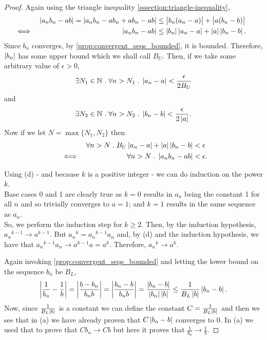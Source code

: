 \documentclass[../MathsNotesBase.tex]{subfiles}
\begin{document}
{\begin{proof}
			Again using the triangle inequality \ref{sssection:triangle-inequality},
			\begin{align*}
				&& \left\lvert a_nb_n - ab\right\rvert = \left\lvert a_nb_n - ab_n + ab_n - ab\right\rvert &\leq \left\lvert b_n(a_n - a)\right\rvert + \left\lvert a(b_n - b)\right\rvert  &\text{\scriptsize{}}\\
				&\iff & \left\lvert a_nb_n - ab\right\rvert &\leq \left\lvert b_n\right\rvert\left\lvert a_n - a\right\rvert + \left\lvert a\right\rvert\left\lvert b_n - b\right\rvert.
			\end{align*}
			Since $b_n$ converges, by \autoref{prop:convergent_seqs_bounded}, it is bounded. Therefore, $\left\lvert b_n\right\rvert$ has some upper bound which we shall call $B_U$. Then, if we take some arbitrary value of ${ \epsilon > 0 }$,
			\[ \exists N_1  \in \mathbb{N}^{} \;.\; \forall n > N_1 \;.\; \left\lvert a_n - a\right\rvert < \frac{\epsilon}{2B_U} \]
			and
			\[ \exists N_2 \in \mathbb{N}^{} \;.\; \forall n > N_2 \;.\; \left\lvert b_n - b\right\rvert < \frac{\epsilon}{2\left\lvert a\right\rvert}. \]
			Now if we let ${ N = \max \{N_1, N_2\} }$ then
			\[\begin{aligned}
				&& \forall n > N \;.\; B_U\left\lvert a_n - a\right\rvert + \left\lvert a\right\rvert\left\lvert b_n - b\right\rvert &< \epsilon \\
				&\iff & \forall n > N \;.\; \left\lvert a_nb_n - ab\right\rvert &< \epsilon.
			\end{aligned}\]
			
			
			Using (d) - and because $k$ is a positive integer - we can do induction on the power $k$.\\
			Base cases 0 and 1 are clearly true as ${ k = 0 }$ results in $a_n$ being the constant 1 for all $n$ and so trivially converges to ${ a = 1 }$; and ${ k = 1 }$ results in the same sequence as $a_n$.\\
			So, we perform the induction step for ${ k \geq 2 }$. Then, by the induction hypothesis, ${ {a_n}^{k-1} \to a^{k-1} }$. But ${ {a_n}^k = {a_n}^{k-1}a_n }$ and, by (d) and the induction hypothesis, we have that ${ {a_n}^{k-1}a_n \to a^{k-1}a = a^k }$. Therefore, ${ {a_n}^k \to a^k. }$
			
			Again invoking \autoref{prop:convergent_seqs_bounded} and letting the lower bound on the sequence $b_n$ be $B_L$,
			\[ \left\lvert\frac{1}{b_n} - \frac{1}{b}\right\rvert = \left\lvert\frac{b - b_n}{b_nb}\right\rvert = \left\lvert\frac{b_n - b}{b_nb}\right\rvert = \frac{ \left\lvert b_n - b\right\rvert }{ \left\lvert b_n\right\rvert\left\lvert b\right\rvert } \leq \frac{1}{B_L\left\lvert b\right\rvert}\left\lvert b_n - b\right\rvert. \]
			Now, since $\frac{1}{B_L\left\lvert b\right\rvert}$ is a constant we can define the constant ${ C = \frac{1}{B_L\left\lvert b\right\rvert} }$ and then we see that in (a) we have already proven that ${ C\left\lvert b_n - b\right\rvert }$ converges to 0. In (a) we used that to prove that ${ Cb_n \to Cb }$ but here it proves that ${ \frac{1}{b_n} \to \frac{1}{b}. }$
		\end{proof}
	
}
\end{document}
